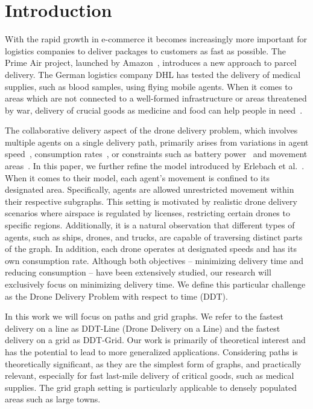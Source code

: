 
\section{Introduction}
With the rapid growth in e-commerce it becomes increasingly more important for logistics companies to deliver packages to customers as fast as possible. 
The Prime Air project, launched by 
Amazon~\cite{aboutamazonDroneProgram}, introduces a new approach to parcel delivery. The German logistics company DHL 
has tested the delivery of medical supplies, such as blood samples, using flying mobile agents. 
When it comes to areas which are not connected to a well-formed infrastructure or areas threatened by war, delivery of crucial goods as medicine and food can help people in need~\cite{bamburry2015drones,hii2019evaluation}. 

The collaborative delivery aspect of the drone delivery problem, which involves multiple agents on a single delivery path, primarily arises from variations in agent speed~\cite{bartschi2018}, consumption rates~\cite{bartschi_et_al:LIPIcs.STACS.2017.10}, or constraints such as battery power~\cite{bartschi2020collaborative} and movement areas~\cite{erlebach:drones}.  
In this paper, we further refine the model introduced by Erlebach et al.~\cite{erlebach:drones}. When it comes to their model, each agent's movement is confined to its designated area. Specifically, agents are allowed unrestricted movement within their respective subgraphs. This setting is motivated by realistic drone delivery scenarios where airspace is regulated by licenses, restricting certain drones to specific regions. Additionally, it is a natural observation that different types of agents, such as ships, drones, and trucks, are capable of traversing distinct parts of the graph. In addition, each drone operates at designated speeds and has its own consumption rate. Although both objectives – minimizing delivery time and reducing consumption – have been extensively studied, our research will exclusively focus on minimizing delivery time. We define this particular challenge as the Drone Delivery Problem with respect to time (DDT).   

In this work we will focus on paths and grid graphs. We refer to the fastest delivery on a line as DDT-Line (Drone Delivery on a Line) and the fastest delivery on a grid as DDT-Grid. Our work is primarily of theoretical interest and has the potential to lead to more generalized applications. Considering paths is theoretically significant, as they are the simplest form of graphs, and practically relevant, especially for fast last-mile delivery of critical goods, such as medical supplies. The grid graph setting is particularly applicable to densely populated areas such as large towns. 

